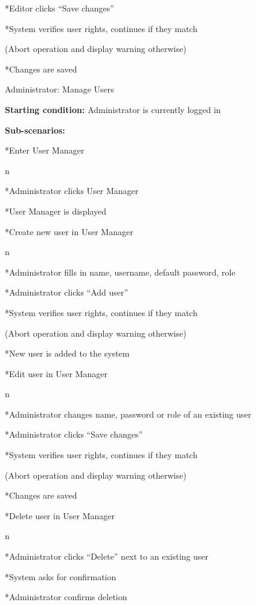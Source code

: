 *Editor clicks “Save changes”

*System verifies user rights, continues if they match

(Abort operation and display warning otherwise)

*Changes are saved

\enditems

\enditems

\secc Administrator: Manage Users

{\bf Starting condition:} Administrator is currently logged in

{\bf Sub-scenarios:}

\begitems

*Enter User Manager

\begitems \style n

*Administrator clicks User Manager

*User Manager is displayed

\enditems

*Create new user in User Manager

\begitems \style n

*Administrator fills in name, username, default password, role

*Administrator clicks “Add user”

*System verifies user rights, continues if they match

(Abort operation and display warning otherwise)

*New user is added to the system

\enditems

*Edit user in User Manager

\begitems \style n

*Administrator changes name, password or role of an existing user

*Administrator clicks “Save changes”

*System verifies user rights, continues if they match

(Abort operation and display warning otherwise)

*Changes are saved

\enditems

*Delete user in User Manager

\begitems \style n

*Administrator clicks “Delete” next to an existing user

*System asks for confirmation

*Administrator confirms deletion

